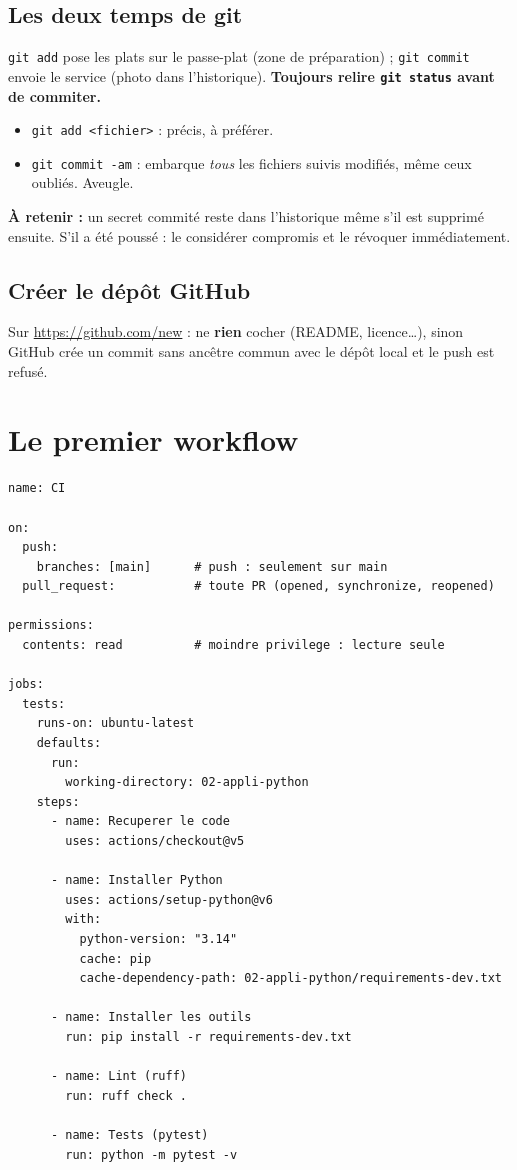\documentclass[11pt,a4paper]{article}
\newcommand{\retenir}[1]{\par\smallskip\noindent\colorbox{fondcode}{\parbox{\dimexpr\linewidth-2\fboxsep}{\textbf{\textcolor{bleu}{À retenir :}} #1}}\par\smallskip}
\newcommand{\cmd}[1]{\texttt{#1}}
\begin{document}
\subsection{Les deux temps de git}
\cmd{git add} pose les plats sur le passe-plat (zone de préparation) ; \cmd{git commit} envoie le service (photo dans l'historique). \textbf{Toujours relire \cmd{git status} avant de commiter.}

\begin{itemize}
  \item \cmd{git add <fichier>} : précis, à préférer.
  \item \cmd{git commit -am} : embarque \emph{tous} les fichiers suivis modifiés, même ceux oubliés. Aveugle.
\end{itemize}

\retenir{un secret commité reste dans l'historique même s'il est supprimé ensuite. S'il a été poussé : le considérer compromis et le révoquer immédiatement.}

\subsection{Créer le dépôt GitHub}
Sur \url{https://github.com/new} : ne \textbf{rien} cocher (README, licence\dots), sinon GitHub crée un commit sans ancêtre commun avec le dépôt local et le push est refusé.

\section{Le premier workflow}

\begin{lstlisting}
name: CI

on:
  push:
    branches: [main]      # push : seulement sur main
  pull_request:           # toute PR (opened, synchronize, reopened)

permissions:
  contents: read          # moindre privilege : lecture seule

jobs:
  tests:
    runs-on: ubuntu-latest
    defaults:
      run:
        working-directory: 02-appli-python
    steps:
      - name: Recuperer le code
        uses: actions/checkout@v5

      - name: Installer Python
        uses: actions/setup-python@v6
        with:
          python-version: "3.14"
          cache: pip
          cache-dependency-path: 02-appli-python/requirements-dev.txt

      - name: Installer les outils
        run: pip install -r requirements-dev.txt

      - name: Lint (ruff)
        run: ruff check .

      - name: Tests (pytest)
        run: python -m pytest -v
\end{lstlisting}
\end{document}
